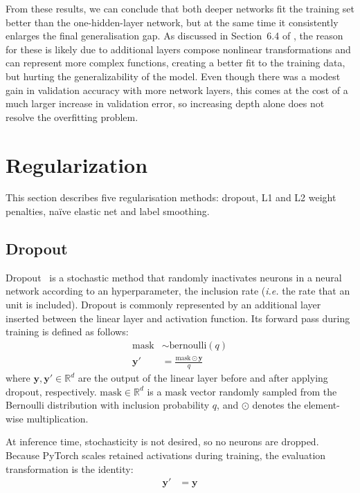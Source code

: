 \documentclass{article}
\begin{document}
From these results, we can conclude that both deeper networks fit the training set better than the one-hidden-layer network, but at the same time it  consistently enlarges the final generalisation gap.
As discussed in Section~6.4 of \citet{Goodfellow-et-al-2016}, the reason for these is likely due to additional layers compose nonlinear transformations and can represent more complex functions, creating a better fit to the training data, but hurting the generalizability of the model.
Even though there was a modest gain in validation accuracy with more network layers, this comes at the cost of a much larger increase in validation error, so increasing depth alone does not resolve the overfitting problem.


\section{Regularization}
\label{sec:task2.1} 

This section describes five regularisation methods:
dropout, L1 and L2 weight penalties, na\"ive elastic net
and label smoothing.


\subsection{Dropout}

Dropout~\cite{srivastava2014dropout} is a stochastic method that randomly inactivates neurons in a neural network according to an hyperparameter, the inclusion rate  (\textit{i.e.} the rate that an unit is included).
Dropout is commonly represented by an additional layer inserted between the linear layer and activation function.
Its forward pass during training is defined as follows:
\begin{align}
    \text{mask} &\sim \text{bernoulli}(q)\\
    \bm{y}' &= \frac{\text{mask} \odot \bm{y}}{q}
\end{align}
where $\bm{y}, \bm{y}' \in \mathbb{R}^d$ are the output of the linear layer before and after applying dropout, respectively. 
$\text{mask} \in \mathbb{R}^d$ is a mask vector randomly sampled from the Bernoulli distribution with inclusion probability $q$, and $\odot$ denotes the element-wise multiplication.

At inference time, stochasticity is not desired, so no neurons are dropped. 
Because PyTorch scales retained activations during training, the evaluation transformation is the identity:
\begin{align}
    \bm{y}' &= \bm{y}
\end{align}
\end{document}
